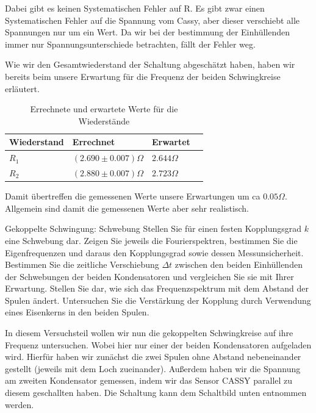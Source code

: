 \documentclass[twoside]{protokoll}
\begin{document}
Dabei gibt es keinen Systematischen Fehler auf R. Es gibt zwar einen Systematischen Fehler auf die Spannung vom Cassy, aber dieser verschiebt alle Spannungen nur um ein Wert.
Da wir bei der bestimmung der Einhüllenden immer nur Spannungsunterschiede betrachten, fällt der Fehler weg.
 
 
Wie wir den Gesamtwiederstand der Schaltung abgeschätzt haben, haben wir bereits beim unsere Erwartung für die Frequenz der beiden Schwingkreise erläutert.
\begin{table}[H]
    \centering
    \begin{tabularx}{1\textwidth}{X X X X} %
        \toprule
        \textbf{Wiederstand} & \textbf{Errechnet} & \textbf{Erwartet} \\
        \midrule
        $R_1$ & $(2.690 \pm 0.007) \Omega$ & $2.644 \Omega$ \\
        $R_2$ & $(2.880 \pm 0.007) \Omega$ & $2.723 \Omega$ \\
        \bottomrule
    \end{tabularx}
    \caption{Errechnete und erwartete Werte für die Wiederstände}
\end{table}
Damit übertreffen die gemessenen Werte unsere Erwartungen um ca $0.05 \Omega$.
Allgemein sind damit die gemessenen Werte aber sehr realistisch.
 
 
\begin{aufgabe}{Gekoppelte Schwingung: Schwebung}
  Stellen Sie für einen festen Kopplungsgrad $k$ eine Schwebung
  dar. Zeigen Sie jeweils die Fourierspektren, bestimmen Sie die
  Eigenfrequenzen und daraus den Kopplungsgrad sowie dessen
  Messunsicherheit. Bestimmen Sie die zeitliche Verschiebung
  $\Delta{}t$ zwischen den beiden Einhüllenden der Schwebungen der
  beiden Kondensatoren und vergleichen Sie sie mit Ihrer
  Erwartung. Stellen Sie dar, wie sich das Frequenzspektrum mit dem
  Abstand der Spulen ändert. Untersuchen Sie die Verstärkung der
  Kopplung durch Verwendung eines Eisenkerns in den beiden Spulen.
\end{aufgabe}

In diesem Versuchsteil wollen wir nun die gekoppelten Schwingkreise auf ihre Frequenz untersuchen. Wobei hier nur einer der beiden Kondensatoren aufgeladen wird.
Hierfür haben wir zunächst die zwei Spulen ohne Abstand nebeneinander gestellt (jeweils mit dem Loch zueinander). 
Außerdem haben wir die Spannung am zweiten Kondensator gemessen, indem wir das Sensor CASSY parallel zu diesem geschallten haben. 
Die Schaltung kann dem Schaltbild unten entnommen werden. \\
\end{document}
